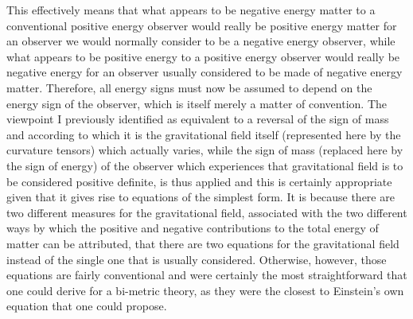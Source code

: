 \documentclass[notitlepage,12pt]{report}
\begin{document}
This effectively means that what appears to be negative energy matter to a conventional positive energy observer would really be positive energy matter for an observer we would normally consider to be a negative energy observer, while what appears to be positive energy to a positive energy observer would really be negative energy for an observer usually considered to be made of negative energy matter. Therefore, all energy signs must now be assumed to depend on the energy sign of the observer, which is itself merely a matter of convention. The viewpoint I previously identified as equivalent to a reversal of the sign of mass and according to which it is the gravitational field itself (represented here by the curvature tensors) which actually varies, while the sign of mass (replaced here by the sign of energy) of the observer which experiences that gravitational field is to be considered positive definite, is thus applied and this is certainly appropriate given that it gives rise to equations of the simplest form. It is because there are two different measures for the gravitational field, associated with the two different ways by which the positive and negative contributions to the total energy of matter can be attributed, that there are two equations for the gravitational field instead of the single one that is usually considered. Otherwise, however, those equations are fairly conventional and were certainly the most straightforward that one could derive for a bi-metric theory, as they were the closest to Einstein's own equation that one could propose.
\end{document}
